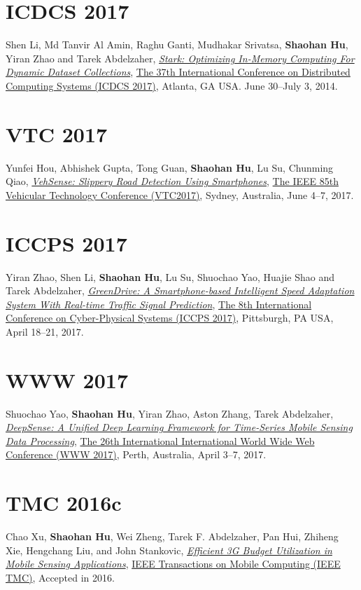 \section{\sc ICDCS 2017}\hypertarget{li2017icdcs}{}
Shen Li, Md Tanvir Al Amin, Raghu Ganti, Mudhakar Srivatsa, \textbf{Shaohan Hu}, Yiran Zhao and Tarek Abdelzaher,
\href{}{\emph{Stark: Optimizing In-Memory Computing For Dynamic Dataset Collections}},
\href{http://icdcs2017.gatech.edu/}{\textsf{The 37th International Conference on Distributed Computing Systems (ICDCS 2017)}},
Atlanta, GA USA. June 30--July 3, 2014.

\section{\sc VTC 2017}\hypertarget{hou2017vtc}{}
Yunfei Hou, Abhishek Gupta, Tong Guan, \textbf{Shaohan Hu}, Lu Su, Chunming Qiao,
\href{}{\emph{VehSense: Slippery Road Detection Using Smartphones}},
\href{http://ieeevtc.org/vtc2017spring}{\textsf{The IEEE 85th Vehicular Technology Conference (VTC2017)}},
Sydney, Australia, June 4--7, 2017.

\section{\sc ICCPS 2017}\hypertarget{zhao2017iccps}{}
Yiran Zhao, Shen Li, \textbf{Shaohan Hu}, Lu Su, Shuochao Yao, Huajie Shao and Tarek Abdelzaher,
\href{}{\emph{GreenDrive: A Smartphone-based Intelligent Speed Adaptation System With Real-time Traffic Signal Prediction}},
\href{http://iccps2017.cse.wustl.edu}{\textsf{The 8th International Conference on Cyber-Physical Systems (ICCPS 2017)}},
Pittsburgh, PA USA, April 18--21, 2017.

\section{\sc WWW 2017}\hypertarget{yao2017www}{}
Shuochao Yao, \textbf{Shaohan Hu}, Yiran Zhao, Aston Zhang, Tarek Abdelzaher,
\href{http://dl.acm.org/citation.cfm?id=3052577}{\emph{DeepSense: A Unified Deep Learning Framework for Time-Series Mobile Sensing Data Processing}},
\href{http://www.www2017.com.au/}{\textsf{The 26th International International World Wide Web Conference (WWW 2017)}},
Perth, Australia, April 3--7, 2017.

\section{\sc TMC 2016c}\hypertarget{xu2016tmc}{}
Chao Xu, \textbf{Shaohan Hu}, Wei Zheng, Tarek F. Abdelzaher, Pan Hui, Zhiheng Xie, Hengchang Liu, and John Stankovic,
\href{}{\emph{Efficient 3G Budget Utilization in Mobile Sensing Applications}},
\href{http://www.computer.org/web/tmc}{\textsf{IEEE Transactions on Mobile Computing (IEEE TMC)}},
Accepted in 2016.

